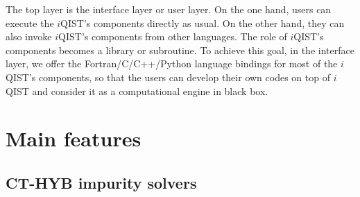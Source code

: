 The top layer is the interface layer or user layer. On the one hand, users can execute the $i$QIST's components directly as usual. On the other hand, they can also invoke $i$QIST's components from other languages. The role of $i$QIST's components becomes a library or subroutine. To achieve this goal, in the interface layer, we offer the Fortran/C/C++/Python language bindings for most of the $i$QIST's components, so that the users can develop their own codes on top of $i$QIST and consider it as a computational engine in black box.

\section{Main features}
\subsection{CT-HYB impurity solvers\label{subsec:azalea}}
